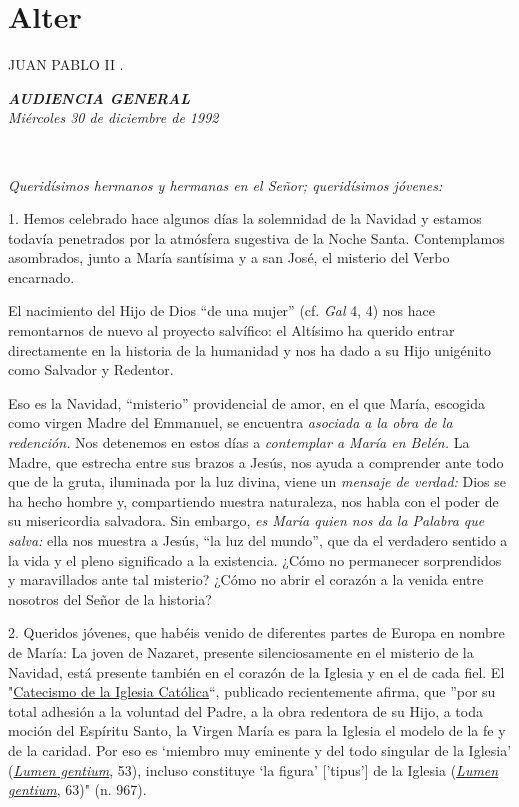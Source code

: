 \section{Alter}
JUAN PABLO II .

\emph{\textbf{AUDIENCIA GENERAL}}\\[2\baselineskip]\emph{Miércoles 30 de
	diciembre de 1992}

~

\emph{Queridísimos hermanos y hermanas en el Señor; queridísimos
	jóvenes:}

1. Hemos celebrado hace algunos días la solemnidad de la Navidad y
estamos todavía penetrados por la atmósfera sugestiva de la Noche Santa.
Contemplamos asombrados, junto a María santísima y a san José, el
misterio del Verbo encarnado.

El nacimiento del Hijo de Dios ``de una mujer'' (cf. \emph{Gal} 4, 4)
nos hace remontarnos de nuevo al proyecto salvífico: el Altísimo ha
querido entrar directamente en la historia de la humanidad y nos ha dado
a su Hijo unigénito como Salvador y Redentor.

Eso es la Navidad, ``misterio'' providencial de amor, en el que María,
escogida como virgen Madre del Emmanuel, se encuentra \emph{asociada a
	la obra de la redención.} Nos detenemos en estos días a \emph{contemplar
	a María en Belén.} La Madre, que estrecha entre sus brazos a Jesús, nos
ayuda a comprender ante todo que de la gruta, iluminada por la luz
divina, viene un \emph{mensaje de verdad:} Dios se ha hecho hombre y,
compartiendo nuestra naturaleza, nos habla con el poder de su
misericordia salvadora. Sin embargo, \emph{es María quien nos da la
	Palabra que salva:} ella nos muestra a Jesús, ``la luz del mundo'', que
da el verdadero sentido a la vida y el pleno significado a la
existencia. ¿Cómo no permanecer sorprendidos y maravillados ante tal
misterio? ¿Cómo no abrir el corazón a la venida entre nosotros del Señor
de la historia?

2. Queridos jóvenes, que habéis venido de diferentes partes de Europa en
nombre de María: La joven de Nazaret, presente silenciosamente en el
misterio de la Navidad, está presente también en el corazón de la
Iglesia y en el de cada fiel. El
"\href{http://www.vatican.va/archive/catechism_sp/index_sp.html}{Catecismo
	de la Iglesia Católica}``, publicado recientemente afirma, que ''por su
total adhesión a la voluntad del Padre, a la obra redentora de su Hijo,
a toda moción del Espíritu Santo, la Virgen María es para la Iglesia el
modelo de la fe y de la caridad. Por eso es `miembro muy eminente y del
todo singular de la Iglesia'
(\emph{\href{http://www.vatican.va/archive/hist_councils/ii_vatican_council/documents/vat-ii_const_19641121_lumen-gentium_sp.html}{Lumen
		gentium}}, 53), \emph{} incluso constituye `la figura' {[}'tipus'{]} de
la Iglesia
(\emph{\href{http://www.vatican.va/archive/hist_councils/ii_vatican_council/documents/vat-ii_const_19641121_lumen-gentium_sp.html}{Lumen
		gentium}}, 63)" (n. 967).

